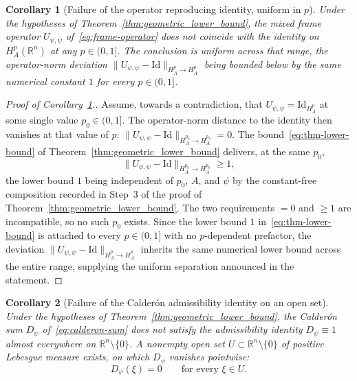 \documentclass[pdflatex,sn-basic,Numbered]{sn-jnl}
\theoremstyle{thmstyleone}%
\newtheorem{corollary}{Corollary}%
\theoremstyle{thmstylethree}%
\begin{document}
\begin{corollary}[Failure of the operator reproducing identity, uniform in $p$]\label{cor:no-reproducing-identity}
	Under the hypotheses of Theorem~\ref{thm:geometric_lower_bound}, the
	mixed frame operator $U_{\psi,\psi}$ of~\eqref{eq:frame-operator} does
	not coincide with the identity on $H^p_A(\mathbb{R}^n)$ at any
	$p \in (0, 1]$. The conclusion is uniform across that range, the
	operator-norm deviation
	$\| U_{\psi,\psi} - \mathrm{Id} \|_{H^p_A \to H^p_A}$ being bounded
	below by the same numerical constant $1$ for every $p \in (0, 1]$.
\end{corollary}

\begin{proof}[Proof of Corollary~\ref{cor:no-reproducing-identity}.]
	Assume, towards a contradiction, that $U_{\psi,\psi} = \mathrm{Id}_{H^p_A}$
	at some single value $p_0 \in (0, 1]$. The operator-norm distance to
	the identity then vanishes at that value of $p$:
	$\| U_{\psi,\psi} - \mathrm{Id} \|_{H^{p_0}_A \to H^{p_0}_A} = 0$. The
	bound~\eqref{eq:thm-lower-bound} of
	Theorem~\ref{thm:geometric_lower_bound} delivers, at the same $p_0$,
	\begin{equation*}
		\| U_{\psi,\psi} - \mathrm{Id} \|_{H^{p_0}_A \to H^{p_0}_A}
		 \ge  1 ,
	\end{equation*}
	the lower bound $1$ being independent of $p_0$, $A$, and $\psi$ by
	the constant-free composition recorded in Step~3 of the proof of
	Theorem~\ref{thm:geometric_lower_bound}. The two requirements $= 0$
	and $\ge 1$ are incompatible, so no such $p_0$ exists. Since the
	lower bound $1$ in~\eqref{eq:thm-lower-bound} is attached to every
	$p \in (0, 1]$ with no $p$-dependent prefactor, the deviation
	$\| U_{\psi,\psi} - \mathrm{Id} \|_{H^p_A \to H^p_A}$ inherits the
	same numerical lower bound across the entire range, supplying the
	uniform separation announced in the statement.
\end{proof}




\begin{corollary}[Failure of the Calder\'on admissibility identity on an open set]\label{cor:calderon-failure}
	Under the hypotheses of Theorem~\ref{thm:geometric_lower_bound}, the
	Calder\'on sum $D_\psi$ of~\eqref{eq:calderon-sum} does not satisfy
	the admissibility identity $D_\psi \equiv 1$ almost everywhere on
	$\mathbb{R}^n \setminus \{0\}$. A nonempty open set
	$U \subset \mathbb{R}^n \setminus \{0\}$ of positive Lebesgue measure
	exists, on which $D_\psi$ vanishes pointwise:
	\begin{equation}\label{eq:calderon-open-vanish}
		D_\psi(\xi)  =  0
		\qquad \text{for every } \xi \in U .
	\end{equation}
\end{corollary}
\end{document}
